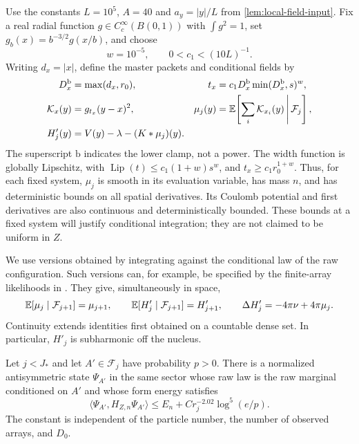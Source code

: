 Use the constants $L=10^5$, $A=40$ and $a_y=|y|/L$ from
\cref{lem:local-field-input}.  Fix a real radial function
$g\in C_c^\infty(B(0,1))$ with $\int g^2=1$, set
$g_b(x)=b^{-3/2}g(x/b)$, and choose
\[
 w=10^{-5},\qquad 0<c_1<(10L)^{-1}.
\]
Writing $d_x=|x|$, define the master packets and conditional fields by
\begin{equation}
 \begin{aligned}
 D_x^{\mathrm b}&=\max(d_x,r_0),&
 t_x&=c_1D_x^{\mathrm b}\min(D_x^{\mathrm b},s)^w,\\
 \mathcal K_x(y)&=g_{t_x}(y-x)^2,&
 \mu_j(y)&=\mathbb E\!\left[\sum_i\mathcal K_{x_i}(y)
                                  \,\middle|\,\mathcal F_j\right],\\
 H'_j(y)&=V(y)-\lambda-(K*\mu_j)(y).
 \end{aligned}
 \label{eq:master-kernel}
\end{equation}
The superscript $\mathrm b$ indicates the lower clamp, not a power.
The width function is globally Lipschitz, with
$\operatorname{Lip}(t)\leq c_1(1+w)s^w$, and
$t_x\geq c_1r_0^{1+w}$.  Thus, for each fixed system, $\mu_j$ is smooth in
its evaluation variable, has mass $n$, and has deterministic bounds on all
spatial derivatives.  Its Coulomb potential and first derivatives are also
continuous and deterministically bounded.  These bounds at a fixed system
will justify conditional integration; they are not claimed to be uniform in
$Z$.

We use versions obtained by integrating against the conditional law of the
raw configuration.  Such versions can, for example, be specified by the
finite-array likelihoods in \cite[\FObservations]{Foundation}.  They give,
simultaneously in space,
\begin{equation}
 \mathbb E[\mu_j\mid\mathcal F_{j+1}]=\mu_{j+1},\qquad
 \mathbb E[H'_j\mid\mathcal F_{j+1}]=H'_{j+1},\qquad
 \Delta H'_j=-4\pi\nu+4\pi\mu_j.
 \label{eq:observation-tower}
\end{equation}
Continuity extends identities first obtained on a countable dense set.
In particular, $H'_j$ is subharmonic off the nucleus.

\begin{lemma}
\label{lem:event-tilt}
Let $j<J_*$ and let $A'\in\mathcal F_j$ have probability $p>0$.
There is a normalized antisymmetric state $\Psi_{A'}$ in the same sector
whose raw law is the raw marginal conditioned on $A'$ and whose form energy
satisfies
\begin{equation}
 \langle\Psi_{A'},H_{Z,n}\Psi_{A'}\rangle
 \leq E_n+C r_j^{-2.02}\log^5(e/p).
 \label{eq:event-tilt-cost}
\end{equation}
The constant is independent of the particle number, the number of observed
arrays, and $D_0$.
\end{lemma}

